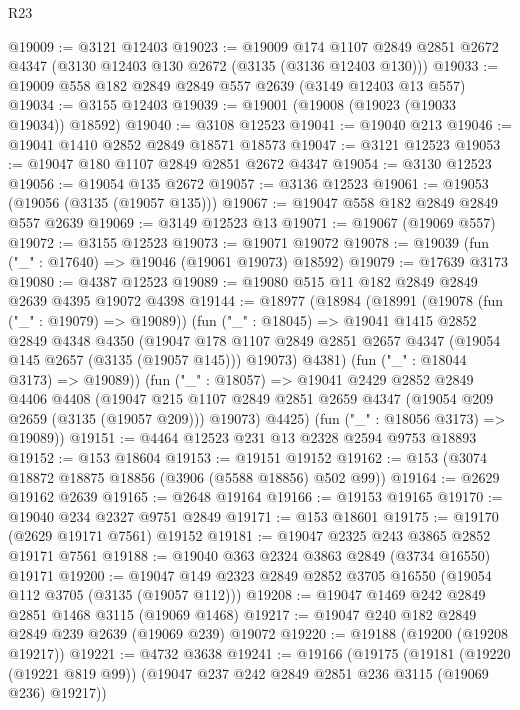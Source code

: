 \begin{lexlean}{R23}
\begin{coremodule}
@19009 := @3121 @12403
@19023 := @19009
    @174
    @1107
    @2849
    @2851
    @2672
    @4347
    (@3130 @12403 @130 @2672 (@3135 (@3136 @12403 @130)))
@19033 := @19009 @558 @182 @2849 @2849 @557 @2639 (@3149 @12403 @13 @557)
@19034 := @3155 @12403
@19039 := @19001 (@19008 (@19023 (@19033 @19034)) @18592)
@19040 := @3108 @12523
@19041 := @19040 @213
@19046 := @19041 @1410 @2852 @2849 @18571 @18573
@19047 := @3121 @12523
@19053 := @19047 @180 @1107 @2849 @2851 @2672 @4347
@19054 := @3130 @12523
@19056 := @19054 @135 @2672
@19057 := @3136 @12523
@19061 := @19053 (@19056 (@3135 (@19057 @135)))
@19067 := @19047 @558 @182 @2849 @2849 @557 @2639
@19069 := @3149 @12523 @13
@19071 := @19067 (@19069 @557)
@19072 := @3155 @12523
@19073 := @19071 @19072
@19078 := @19039 (fun ("_" : @17640) => @19046 (@19061 @19073) @18592)
@19079 := @17639 @3173
@19080 := @4387 @12523
@19089 := @19080 @515 @11 @182 @2849 @2849 @2639 @4395 @19072 @4398
@19144 := @18977
    (@18984
      (@18991
        (@19078 (fun ("_" : @19079) => @19089))
        (fun ("_" : @18045) =>
        @19041
          @1415
          @2852
          @2849
          @4348
          @4350
          (@19047
            @178
            @1107
            @2849
            @2851
            @2657
            @4347
            (@19054 @145 @2657 (@3135 (@19057 @145)))
            @19073)
          @4381)
        (fun ("_" : @18044 @3173) => @19089))
      (fun ("_" : @18057) =>
      @19041
        @2429
        @2852
        @2849
        @4406
        @4408
        (@19047 @215 @1107 @2849 @2851 @2659 @4347 (@19054 @209 @2659 (@3135 (@19057 @209))) @19073)
        @4425)
      (fun ("_" : @18056 @3173) => @19089))
@19151 := @4464 @12523 @231 @13 @2328 @2594 @9753 @18893
@19152 := @153 @18604
@19153 := @19151 @19152
@19162 := @153 (@3074 @18872 @18875 @18856 (@3906 (@5588 @18856) @502 @99))
@19164 := @2629 @19162 @2639
@19165 := @2648 @19164
@19166 := @19153 @19165
@19170 := @19040 @234 @2327 @9751 @2849
@19171 := @153 @18601
@19175 := @19170 (@2629 @19171 @7561) @19152
@19181 := @19047 @2325 @243 @3865 @2852 @19171 @7561
@19188 := @19040 @363 @2324 @3863 @2849 (@3734 @16550) @19171
@19200 := @19047 @149 @2323 @2849 @2852 @3705 @16550 (@19054 @112 @3705 (@3135 (@19057 @112)))
@19208 := @19047 @1469 @242 @2849 @2851 @1468 @3115 (@19069 @1468)
@19217 := @19047 @240 @182 @2849 @2849 @239 @2639 (@19069 @239) @19072
@19220 := @19188 (@19200 (@19208 @19217))
@19221 := @4732 @3638
@19241 := @19166
    (@19175
      (@19181
        (@19220 (@19221 @819 @99))
        (@19047 @237 @242 @2849 @2851 @236 @3115 (@19069 @236) @19217))

\end{coremodule}
\end{lexlean}
